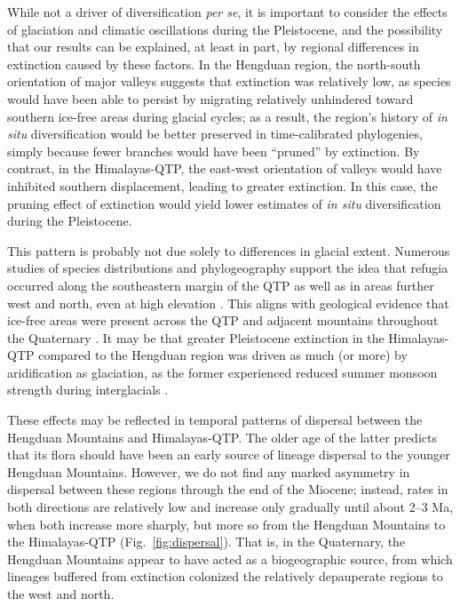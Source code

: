 
While not a driver of diversification \textit{per se}, it is important
to consider the effects of glaciation and climatic oscillations during
the Pleistocene, and the possibility that our results can be
explained, at least in part, by regional differences in extinction
caused by these factors. In the Hengduan region, the north-south
orientation of major valleys suggests that extinction was relatively
low, as species would have been able to persist by migrating
relatively unhindered toward southern ice-free areas during glacial
cycles; as a result, the region's history of \textit{in situ}
diversification would be better preserved in time-calibrated
phylogenies, simply because fewer branches would have been ``pruned''
by extinction. By contrast, in the Himalayas-QTP, the east-west
orientation of valleys would have inhibited southern displacement,
leading to greater extinction. In this case, the pruning effect of
extinction would yield lower estimates of \textit{in situ}
diversification during the Pleistocene.

This pattern is probably not due solely to differences in glacial
extent. Numerous studies of species distributions
\citep[e.g.,][]{srinivasan2014,lopez2011} and phylogeography
\citep[e.g.,][]{CunY2010,WangBS2011,lei2014,meng2015} support the idea
that refugia occurred along the southeastern margin of the QTP as well
as in areas further west and north, even at high elevation
\citep[e.g.,][]{wang2009,sun2010,opgenoorth2010}. This aligns with
geological evidence that ice-free areas were present across the QTP
and adjacent mountains throughout the Quaternary
\citep[see][]{owen2014}. It may be that greater Pleistocene extinction
in the Himalayas-QTP compared to the Hengduan region was driven as
much (or more) by aridification as glaciation, as the former
experienced reduced summer monsoon strength during interglacials
\citep{owen2008}.

These effects may be reflected in temporal patterns of dispersal
between the Hengduan Mountains and Himalayas-QTP. The older age of the
latter predicts that its flora should have been an early source of
lineage dispersal to the younger Hengduan Mountains. However, we do
not find any marked asymmetry in dispersal between these regions
through the end of the Miocene; instead, rates in both directions are
relatively low and increase only gradually until about 2--3 Ma, when
both increase more sharply, but more so from the Hengduan Mountains to
the Himalayas-QTP (Fig.~\ref{fig:dispersal}). That is, in the
Quaternary, the Hengduan Mountains appear to have acted as a
biogeographic source, from which lineages buffered from extinction
colonized the relatively depauperate regions to the west and
north. %

